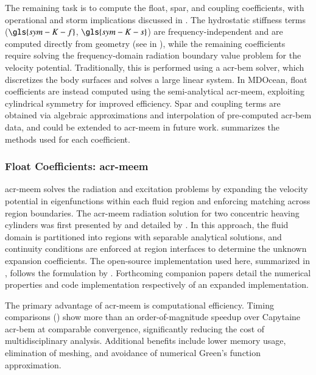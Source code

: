 The remaining task is to compute the float, spar, and coupling coefficients, with operational and storm implications discussed in .
The hydrostatic stiffness terms ($\gls{sym-K-f}$, $\gls{sym-K-s}$) are frequency-independent and are computed directly from geometry (see  in ), while the remaining coefficients require solving the frequency-domain radiation boundary value problem for the velocity potential.
Traditionally, this is performed using a \gls{acr-bem} solver, which discretizes the body surfaces and solves a large linear system.
In MDOcean, float coefficients are instead computed using the semi-analytical \gls{acr-meem}, exploiting cylindrical symmetry for improved efficiency.
Spar and coupling terms are obtained via algebraic approximations and interpolation of pre-computed \gls{acr-bem} data, and could be extended to \gls{acr-meem} in future work.
 summarizes the methods used for each coefficient.

\subsubsection{Float Coefficients: \gls{acr-meem}}\label{sec:hydro-meem}
\gls{acr-meem} solves the radiation and excitation problems by expanding the velocity potential in eigenfunctions within each fluid region and enforcing matching across region boundaries.
The \gls{acr-meem} radiation solution for two concentric heaving cylinders was first presented by \citet{mavrakos_hydrodynamic_2004} and detailed by \citet{chau_inertia_2012}.
In this approach, the fluid domain is partitioned into regions with separable analytical solutions, and continuity conditions are enforced at region interfaces to determine the unknown expansion coefficients.
The open-source implementation used here, summarized in , follows the formulation by \citet{mccabe_open-source_2024}.
Forthcoming companion papers \citet{bimali_matrix_2026,best_openflash_2026} detail the numerical properties and code implementation respectively of an expanded implementation.

The primary advantage of \gls{acr-meem} is computational efficiency.
Timing comparisons () show more than an order-of-magnitude speedup over Capytaine \gls{acr-bem} at comparable convergence, significantly reducing the cost of multidisciplinary analysis.
Additional benefits include lower memory usage, elimination of meshing, and avoidance of numerical Green’s function approximation.

